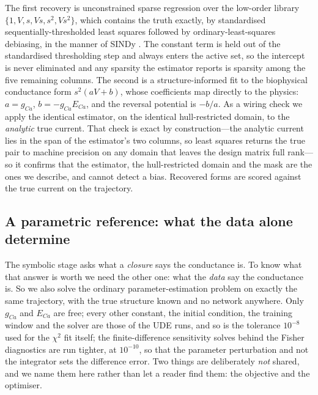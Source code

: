 \documentclass{article}
\newcommand{\TolFisher}{10^{-10}}
\newcommand{\Tol}{10^{-8}}     %
\begin{document}
The first recovery is unconstrained sparse regression over the low-order library
$\{1, V, s, Vs, s^2, Vs^2\}$, which contains the truth exactly, by standardised
sequentially-thresholded least squares followed by ordinary-least-squares
debiasing, in the manner of SINDy \citep{brunton2016sindy}. The constant term is
held out of the standardised thresholding step and always enters the active set,
so the intercept is never eliminated and any sparsity the estimator reports is
sparsity among the five remaining columns. The second is a
structure-informed fit to the biophysical conductance form $s^2(aV+b)$, whose
coefficients map directly to the physics: $a=g_{Ca}$, $b=-g_{Ca}E_{Ca}$, and the
reversal potential is $-b/a$. As a wiring check we apply the identical
estimator, on the identical hull-restricted domain, to the \emph{analytic} true
current. That check is exact by construction---the analytic current lies in the
span of the estimator's two columns, so least squares returns the true pair to
machine precision on any domain that leaves the design matrix full rank---so it
confirms that the estimator, the hull-restricted domain and the mask are the ones
we describe, and cannot detect a bias. Recovered forms are
scored against the true current on the trajectory.

\subsection{A parametric reference: what the data alone determine}
\label{sec:methods-parametric}

The symbolic stage asks what a \emph{closure} says the conductance is. To know
what that answer is worth we need the other one: what the \emph{data} say the
conductance is. So we also solve the ordinary parameter-estimation problem on
exactly the same trajectory, with the true structure known and no network
anywhere. Only $g_{Ca}$ and $E_{Ca}$ are free; every other constant, the initial
condition, the training window and the solver are those of the UDE runs, and so
is the tolerance $\Tol$ used for the $\chi^2$ fit itself; the finite-difference
sensitivity solves behind the Fisher diagnostics are run tighter, at
$\TolFisher$, so that the parameter perturbation and not the integrator sets the
difference error. Two things are deliberately \emph{not} shared, and we name them here
rather than let a reader find them: the objective and the optimiser.
\end{document}
